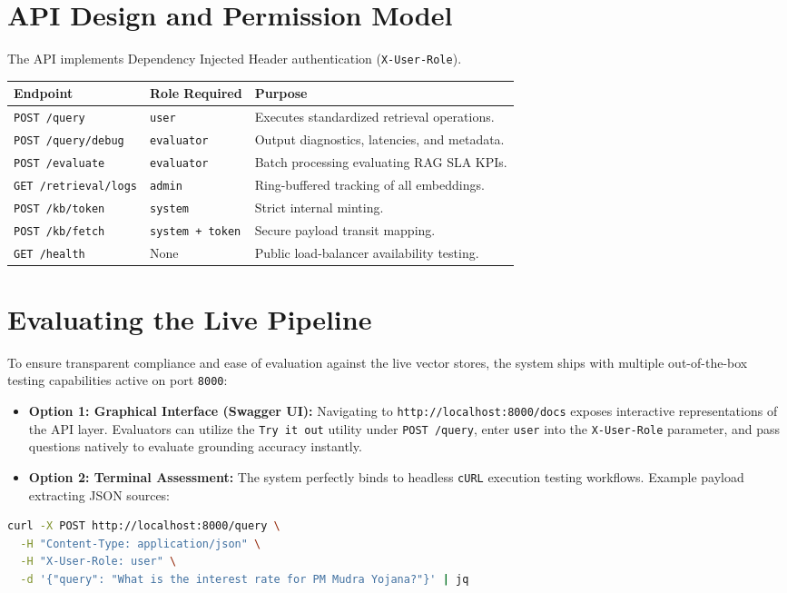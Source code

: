 \documentclass[11pt,a4paper]{article}
\begin{document}
\section{API Design and Permission Model}
The API implements Dependency Injected Header authentication (\texttt{X-User-Role}).
\begin{table}[h]
\centering
\begin{tabular}{@{}llp{8cm}@{}}
\toprule
\textbf{Endpoint} & \textbf{Role Required} & \textbf{Purpose} \\ \midrule
\texttt{POST /query} & \texttt{user} & Executes standardized retrieval operations. \\
\texttt{POST /query/debug} & \texttt{evaluator} & Output diagnostics, latencies, and metadata. \\
\texttt{POST /evaluate} & \texttt{evaluator} & Batch processing evaluating RAG SLA KPIs. \\
\texttt{GET /retrieval/logs} & \texttt{admin} & Ring-buffered tracking of all embeddings. \\
\texttt{POST /kb/token} & \texttt{system} & Strict internal minting. \\
\texttt{POST /kb/fetch} & \texttt{system + token} & Secure payload transit mapping. \\
\texttt{GET /health} & None & Public load-balancer availability testing. \\
\bottomrule
\end{tabular}
\end{table}

\section{Evaluating the Live Pipeline}
To ensure transparent compliance and ease of evaluation against the live vector stores, the system ships with multiple out-of-the-box testing capabilities active on port \texttt{8000}:
\begin{itemize}
    \item \textbf{Option 1: Graphical Interface (Swagger UI):} Navigating to \texttt{http://localhost:8000/docs} exposes interactive representations of the API layer. Evaluators can utilize the \texttt{Try it out} utility under \texttt{POST /query}, enter \texttt{user} into the \texttt{X-User-Role} parameter, and pass questions natively to evaluate grounding accuracy instantly.
    \item \textbf{Option 2: Terminal Assessment:} The system perfectly binds to headless \texttt{cURL} execution testing workflows. Example payload extracting JSON sources:
\end{itemize}
\begin{lstlisting}[language=bash]
curl -X POST http://localhost:8000/query \
  -H "Content-Type: application/json" \
  -H "X-User-Role: user" \
  -d '{"query": "What is the interest rate for PM Mudra Yojana?"}' | jq
\end{lstlisting}
\end{document}
